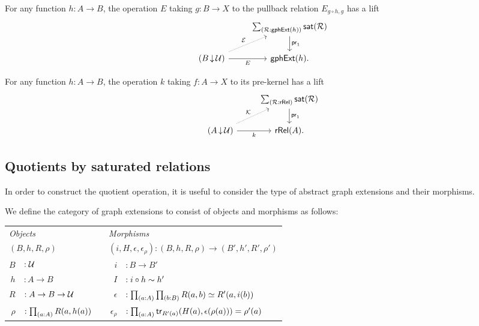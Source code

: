 \begin{cor}
For any function $h:A\to B$, the operation $E$ taking $g:B\to X$ to the pullback relation $E_{g\circ h,g}$ has a lift
\begin{equation*}
\begin{tikzcd}
& \sm{\mathcal{R}:\mathsf{gphExt}(h)}\mathsf{sat}(\mathcal{R}) \arrow[d,"\proj 1"] \\
(B\,{\downarrow}\,\UU) \arrow[r,swap,"E"] \arrow[ur,densely dotted,"\mathcal{E}"] & \mathsf{gphExt}(h).
\end{tikzcd}
\end{equation*}
\end{cor}

\begin{cor}
For any function $h:A\to B$, the operation $k$ taking $f:A\to X$ to its pre-kernel has a lift
\begin{equation*}
\begin{tikzcd}
& \sm{\mathcal{R}:\mathsf{rRel}}\mathsf{sat}(\mathcal{R}) \arrow[d,"\proj 1"] \\
(A\,{\downarrow}\,\UU) \arrow[r,swap,"k"] \arrow[ur,densely dotted,"\mathcal{K}"] & \mathsf{rRel}(A).
\end{tikzcd}
\end{equation*}
\end{cor}

\subsection{Quotients by saturated relations}

In order to construct the quotient operation, it is useful to consider the type of abstract graph extensions and their morphisms.

\begin{defn}\label{defn:seq_sat}
We define the category of graph extensions to consist of objects and morphisms as follows:
\begin{center}
\begin{tabular}{rlcrl}
\toprule
\multicolumn{2}{l}{\emph{Objects}} & & \multicolumn{2}{l}{\emph{Morphisms}} \\
\multicolumn{2}{l}{$(B,h,R,\rho)$} & & \multicolumn{2}{l}{$(i,H,\epsilon,\epsilon_\rho):(B,h,R,\rho)\to(B',h',R',\rho')$} \\
\midrule
$B$ & $:\mathcal{U}$ & & $i$ & $:B\to B'$\\
$h$ & $:A\to B$ & & $I$ & $:i\circ h\sim h'$ \\
$R$ & $:A\to B\to\mathcal{U}$ & & $\epsilon$ & $: \prd{a:A}{b:B}R(a,b)\eqvsym R'(a,i(b))$ \\
$\rho$ & $: \prd{a:A}R(a,h(a))$ & & $\epsilon_\rho$ & $: \prd{a:A} \mathsf{tr}_{R'(a)}(H(a),\epsilon(\rho(a)))=\rho'(a)$ \\
\bottomrule
\end{tabular}
\end{center}
\end{defn}

